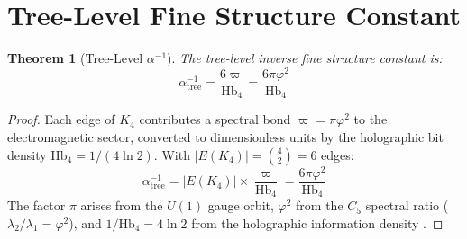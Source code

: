 \documentclass[11pt,a4paper]{article}
\newtheorem{theorem}{Theorem}[section]
\theoremstyle{definition}
\newcommand{\Hbfour}{\mathrm{Hb}_4}
\begin{document}
\section{Tree-Level Fine Structure Constant}
\label{sec:tree}

\begin{theorem}[Tree-Level $\alpha^{-1}$]
\label{thm:tree}
The tree-level inverse fine structure constant is:
\begin{equation}
\alpha^{-1}_{\text{tree}} = \frac{6\varpi}{\Hbfour} = \frac{6\pi\varphi^2}{\Hbfour}
\label{eq:tree}
\end{equation}
\end{theorem}

\begin{proof}
Each edge of $K_4$ contributes a spectral bond $\varpi = \pi\varphi^2$ to the electromagnetic sector, converted to dimensionless units by the holographic bit density $\Hbfour = 1/(4\ln 2)$. With $|E(K_4)| = \binom{4}{2} = 6$ edges:
\[
\alpha^{-1}_{\text{tree}} = |E(K_4)| \times \frac{\varpi}{\Hbfour} = \frac{6\pi\varphi^2}{\Hbfour}
\]
The factor $\pi$ arises from the $U(1)$ gauge orbit, $\varphi^2$ from the $C_5$ spectral ratio ($\lambda_2/\lambda_1 = \varphi^2$), and $1/\Hbfour = 4\ln 2$ from the holographic information density \cite{Bekenstein1973,Hawking1975}.
\end{proof}
\end{document}
